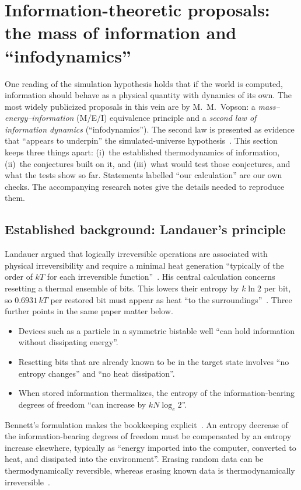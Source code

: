 \section{Information-theoretic proposals: the mass of information and ``infodynamics''}
\label{sec:information}

One reading of the simulation hypothesis holds that if the world is computed, information should
behave as a physical quantity with dynamics of its own. The most widely publicized proposals in this
vein are by M.~M.~Vopson: a \emph{mass--energy--information} (M/E/I) equivalence principle and a
\emph{second law of information dynamics} (``infodynamics''). The second law is presented as
evidence that ``appears to underpin'' the simulated-universe hypothesis~\cite{Vopson2023second}.
This section keeps three things apart:
(i)~the established thermodynamics of information,
(ii)~the conjectures built on it, and
(iii)~what would test those conjectures, and what the tests show so far.
Statements labelled ``our calculation'' are our own checks. The accompanying research notes give
the details needed to reproduce them.

\subsection{Established background: Landauer's principle}
\label{sec:information:landauer}

Landauer argued that logically irreversible operations are associated with physical irreversibility
and require a minimal heat generation ``typically of the order of $kT$ for each irreversible
function''~\cite{Landauer1961irreversibility}. His central calculation concerns resetting a thermal
ensemble of bits. This lowers their entropy by $k\ln 2$ per bit, so $0.6931\,kT$ per restored bit
must appear as heat ``to the surroundings''~\cite{Landauer1961irreversibility}.
Three further points in the same paper matter below.
\begin{itemize}
\item Devices such as a particle in a symmetric bistable well ``can hold information without
  dissipating energy''.
\item Resetting bits that are already known to be in the target state involves ``no entropy
  changes'' and ``no heat dissipation''.
\item When stored information thermalizes, the entropy of the information-bearing degrees of
  freedom ``can increase by $kN\log_e 2$''.
\end{itemize}
Bennett's formulation makes the bookkeeping explicit~\cite{Bennett2003notes}. An entropy decrease
of the information-bearing degrees of freedom must be compensated by an entropy increase elsewhere,
typically as ``energy imported into the computer, converted to heat, and dissipated into the
environment''. Erasing random data can be thermodynamically reversible, whereas erasing known data is
thermodynamically irreversible~\cite{Bennett2003notes}.


